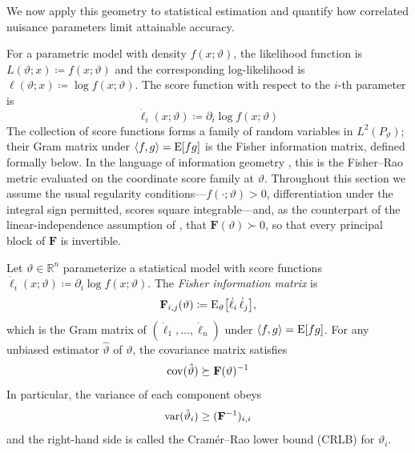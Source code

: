 \documentclass{IEEEtran}
\begin{document}
We now apply this geometry to statistical estimation and quantify how correlated nuisance parameters limit attainable accuracy.

For a parametric model with density $f(x;\vartheta)$, the likelihood function is $L(\vartheta; x) \coloneq f(x;\vartheta)$ and the corresponding log-likelihood is $\ell(\vartheta; x) \coloneq \log f(x;\vartheta)$. The score function with respect to the $i$-th parameter is
\begin{equation*}
  \dot{\ell}_{i}(x;\vartheta) \coloneq \partial_{i} \log f(x;\vartheta)
\end{equation*}
The collection of score functions forms a family of random variables in $L^{2}(P_{\vartheta})$; their Gram matrix under $\langle f,g\rangle = \operatorname{E}[fg]$ is the Fisher information matrix, defined formally below. In the language of information geometry \cite{amari2000}, this is the Fisher--Rao metric evaluated on the coordinate score family at $\vartheta$. Throughout this section we assume the usual regularity conditions---$f(\cdot;\vartheta) > 0$, differentiation under the integral sign permitted, scores square integrable---and, as the counterpart of the linear-independence assumption of , that $\mathbf{F}(\vartheta) \succ 0$, so that every principal block of $\mathbf{F}$ is invertible.

\begin{definition}
  Let $\vartheta \in \mathbb{R}^{n}$ parameterize a statistical model with score functions $\dot{\ell}_{i}(x;\vartheta) \coloneq \partial_{i}\log f(x;\vartheta)$. The \emph{Fisher information matrix} is
  \begin{equation*}
    \mathbf{F}_{i,j}(\vartheta) \coloneq \operatorname{E}_{\vartheta}\bigl[\dot{\ell}_{i}\,\dot{\ell}_{j}\bigr],
  \end{equation*}
  which is the Gram matrix of $(\dot{\ell}_{1},\ldots,\dot{\ell}_{n})$ under $\langle f,g\rangle = \operatorname{E}[fg]$. For any unbiased estimator $\hat{\vartheta}$ of $\vartheta$, the covariance matrix satisfies
  \begin{equation*}
    \operatorname{cov}(\hat{\vartheta}) \succeq \mathbf{F}(\vartheta)^{-1}
  \end{equation*}
  In particular, the variance of each component obeys
  \begin{equation*}
    \operatorname{var}(\hat{\vartheta}_{i}) \ge (\mathbf{F}^{-1})_{i,i}
  \end{equation*}
  and the right-hand side is called the Cram\'er--Rao lower bound (CRLB) for $\vartheta_{i}$.
\end{definition}
\end{document}
